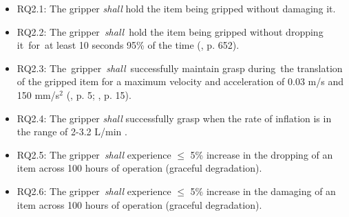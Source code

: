 \documentclass[lettersize,journal]{IEEEtran}
\begin{document}
\begin{itemize}
	\item RQ2.1: The gripper \emph{shall} hold the item being gripped without damaging it. 
	\item RQ2.2: The gripper \emph{shall} hold the item being gripped without dropping it for at least 10 seconds 95\% of the time (\cite{Sotiropoulos2018}, p. 652).
	\item RQ2.3: The gripper \emph{shall} successfully maintain grasp during the translation of the gripped item for a maximum velocity and acceleration of 0.03 m/s and 150 mm/s$^2$ (\cite{Triantafyllou2019}, p. 5; \cite{Cheng2021}, p. 15).
	\item RQ2.4: The gripper \emph{shall} successfully grasp when the rate of inflation is in the range of 2-3.2 L/min \cite{DEWIN2022}.
	\item RQ2.5: The gripper \emph{shall} experience $\le$ 5\% increase in the dropping of an item across 100 hours of operation (graceful degradation). %
	\item RQ2.6: The gripper \emph{shall} experience $\le$ 5\% increase in the damaging of an item across 100 hours of operation (graceful degradation).  %
\end{itemize}
\end{document}
